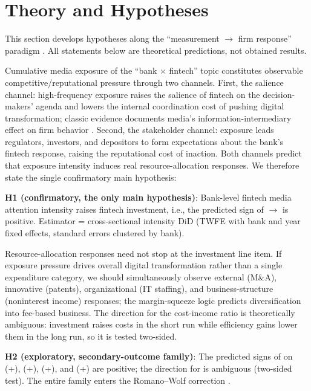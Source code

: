 \section{Theory and Hypotheses}\label{sec:theory}

This section develops hypotheses along the ``measurement $\to$ firm response''
paradigm \parencite{hassan2019firm}. All statements below are theoretical
predictions, not obtained results.

Cumulative media exposure of the ``bank $\times$ fintech'' topic constitutes
observable competitive/reputational pressure through two channels. First, the
salience channel: high-frequency exposure raises the salience of fintech on
the decision-makers' agenda and lowers the internal coordination cost of
pushing digital transformation; classic evidence documents media's
information-intermediary effect on firm behavior
\parencite{fang2009media,engelberg2011causal}. Second, the stakeholder
channel: exposure leads regulators, investors, and depositors to form
expectations about the bank's fintech response, raising the reputational cost
of inaction. Both channels predict that exposure intensity induces real
resource-allocation responses. We therefore state the single confirmatory
main hypothesis:

\textbf{H1 (confirmatory, the only main hypothesis)}: Bank-level fintech media
attention intensity raises fintech investment, i.e., the predicted sign of
 $\to$  is
positive. Estimator = cross-sectional intensity DiD (TWFE with bank and year
fixed effects, standard errors clustered by bank).

Resource-allocation responses need not stop at the investment line item. If
exposure pressure drives overall digital transformation rather than a single
expenditure category, we should simultaneously observe external (M\&A),
innovative (patents), organizational (IT staffing), and business-structure
(noninterest income) responses; the margin-squeeze logic
\parencite{parlour2022payment} predicts diversification into fee-based
business. The direction for the cost-income ratio is theoretically ambiguous:
investment raises costs in the short run while efficiency gains lower them in
the long run, so it is tested two-sided.

\textbf{H2 (exploratory, secondary-outcome family)}: The predicted signs of
 on  (+),
 (+),  (+), and
 (+) are positive; the direction for
 is ambiguous (two-sided test). The entire family
enters the Romano--Wolf correction \parencite{romanowolf2005snooping}.


